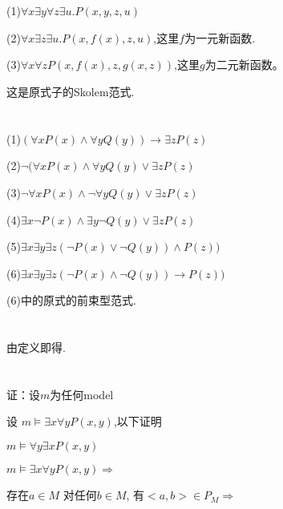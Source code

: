 \documentclass{article}
\begin{document}
\begin{CJK*}{UTF8}{gbsn}

\section{}

(1)$\forall x \exists y \forall z \exists u. P(x,y,z,u)$

(2)$\forall x \exists z \exists u. P(x,f(x),z,u)$,这里$f$为一元新函数.

(3)$\forall x \forall z P(x,f(x),z,g(x,z))$,这里$g$为二元新函数。

这是原式子的Skolem范式.


\section{}

(1)$(\forall x P(x) \land \forall y Q(y)) \rightarrow \exists z P(z)$

(2)$\neg (\forall x P(x) \land \forall y Q(y) \lor \exists z P(z)$

(3)$\neg \forall x P(x) \land \neg \forall y Q(y) \lor \exists z P(z)$

(4)$ \exists x \neg P(x) \land \exists y \neg Q(y) \lor \exists z P(z)$

(5)$ \exists x \exists y \exists z (\neg P(x) \lor \neg Q(y)) \land  P(z))$

(6)$ \exists x \exists y \exists z (\neg P(x) \land \neg Q(y)) \rightarrow  P(z))$

(6)中的原式的前束型范式.



\section{}

由定义即得.


\section{}

证：设$m$为任何model

设 $m \vDash \exists x \forall y P(x,y)$,以下证明

$m \vDash \forall y \exists x  P(x,y)$

$m \vDash \exists x \forall y P(x,y) \Rightarrow$

存在$a \in M$ 对任何$b\in M$, 有$<a,b>\in P_M \Rightarrow$


\end{CJK*}
\end{document}
